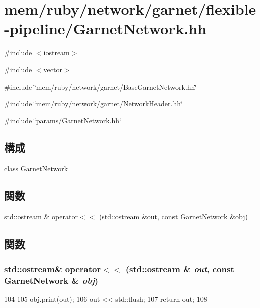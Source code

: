 \hypertarget{GarnetNetwork_8hh}{
\section{mem/ruby/network/garnet/flexible-\/pipeline/GarnetNetwork.hh}
\label{GarnetNetwork_8hh}
}
{\ttfamily \#include $<$iostream$>$}\par
{\ttfamily \#include $<$vector$>$}\par
{\ttfamily \#include \char`\"{}mem/ruby/network/garnet/BaseGarnetNetwork.hh\char`\"{}}\par
{\ttfamily \#include \char`\"{}mem/ruby/network/garnet/NetworkHeader.hh\char`\"{}}\par
{\ttfamily \#include \char`\"{}params/GarnetNetwork.hh\char`\"{}}\par
\subsection*{構成}
\begin{DoxyCompactItemize}
\item 
class \hyperlink{classGarnetNetwork}{GarnetNetwork}
\end{DoxyCompactItemize}
\subsection*{関数}
\begin{DoxyCompactItemize}
\item 
std::ostream \& \hyperlink{GarnetNetwork_8hh_a92e260b2e1aff60cc1f9f2a1d86ee5fc}{operator$<$$<$} (std::ostream \&out, const \hyperlink{classGarnetNetwork}{GarnetNetwork} \&obj)
\end{DoxyCompactItemize}


\subsection{関数}
\hypertarget{GarnetNetwork_8hh_a92e260b2e1aff60cc1f9f2a1d86ee5fc}{
\subsubsection[{operator$<$$<$}]{\setlength{\rightskip}{0pt plus 5cm}std::ostream\& operator$<$$<$ (std::ostream \& {\em out}, \/  const {\bf GarnetNetwork} \& {\em obj})}}
\label{GarnetNetwork_8hh_a92e260b2e1aff60cc1f9f2a1d86ee5fc}



\begin{DoxyCode}
104 {
105     obj.print(out);
106     out << std::flush;
107     return out;
108 }
\end{DoxyCode}
